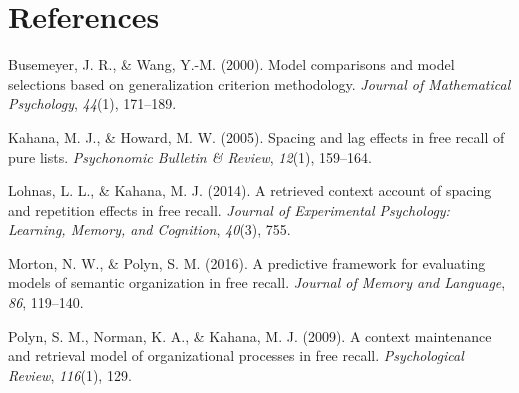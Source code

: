 \documentclass[
  letterpaper,
  DIV=11]{article}
\newlength{\cslhangindent}
\newlength{\cslentryspacingunit} %
\newenvironment{CSLReferences}[2] %
 {%
  \setlength{\parindent}{0pt}
  \ifodd #1
  \let\oldpar\par
  \def\par{\hangindent=\cslhangindent\oldpar}
  \fi
  \setlength{\parskip}{#2\cslentryspacingunit}
 }%
 {}
\begin{document}
\hypertarget{references}{%
\section{References}\label{references}}

\hypertarget{refs}{}
\begin{CSLReferences}{1}{0}
\leavevmode{}%
Busemeyer, J. R., \& Wang, Y.-M. (2000). Model comparisons and model
selections based on generalization criterion methodology. \emph{Journal
of Mathematical Psychology}, \emph{44}(1), 171--189.

\leavevmode{}%
Kahana, M. J., \& Howard, M. W. (2005). Spacing and lag effects in free
recall of pure lists. \emph{Psychonomic Bulletin \& Review},
\emph{12}(1), 159--164.

\leavevmode{}%
Lohnas, L. L., \& Kahana, M. J. (2014). A retrieved context account of
spacing and repetition effects in free recall. \emph{Journal of
Experimental Psychology: Learning, Memory, and Cognition}, \emph{40}(3),
755.

\leavevmode{}%
Morton, N. W., \& Polyn, S. M. (2016). A predictive framework for
evaluating models of semantic organization in free recall. \emph{Journal
of Memory and Language}, \emph{86}, 119--140.

\leavevmode{}%
Polyn, S. M., Norman, K. A., \& Kahana, M. J. (2009). A context
maintenance and retrieval model of organizational processes in free
recall. \emph{Psychological Review}, \emph{116}(1), 129.

\end{CSLReferences}
\end{document}
